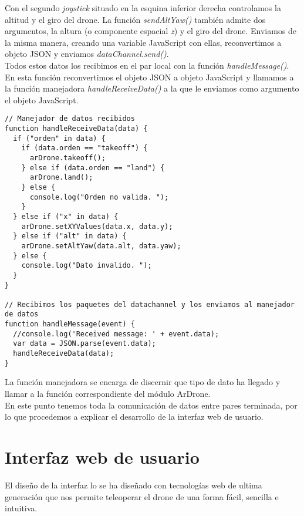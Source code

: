 Con el segundo \emph{joystick} situado en la esquina inferior derecha controlamos la altitud y el giro del drone. La función \emph{sendAltYaw()} también admite dos argumentos, la altura (o componente espacial \emph{z}) y el giro del drone. Enviamos de la misma manera, creando una variable JavaScript con ellas, reconvertimos a objeto JSON y enviamos \emph{dataChannel.send()}.\\

Todos estos datos los recibimos en el par local con la función \emph{handleMessage()}. En esta función reconvertimos el objeto JSON a objeto JavaScript y llamamos a la función manejadora \emph{handleReceiveData()} a la que le enviamos como argumento el objeto JavaScript.\\

\begin{lstlisting}[caption=Manejo de las órdenes recibidas en el par local.]
// Manejador de datos recibidos 
function handleReceiveData(data) {
  if ("orden" in data) {
    if (data.orden == "takeoff") {
      arDrone.takeoff();
    } else if (data.orden == "land") {
      arDrone.land();
    } else {
      console.log("Orden no valida. ");
    }
  } else if ("x" in data) {
    arDrone.setXYValues(data.x, data.y);
  } else if ("alt" in data) {
    arDrone.setAltYaw(data.alt, data.yaw);
  } else {
    console.log("Dato invalido. ");
  }		
}

// Recibimos los paquetes del datachannel y los enviamos al manejador de datos
function handleMessage(event) {
  //console.log('Received message: ' + event.data);
  var data = JSON.parse(event.data);
  handleReceiveData(data);
}
\end{lstlisting}


La función manejadora se encarga de discernir que tipo de dato ha llegado y llamar a la función correspondiente del módulo ArDrone.\\

En este punto tenemos toda la comunicación de datos entre pares terminada, por lo que procedemos a explicar el desarrollo de la interfaz web de usuario.\\

\section{Interfaz web de usuario}

El diseño de la interfaz lo se ha diseñado con tecnologías web de ultima generación que nos permite teleoperar el drone de una forma fácil, sencilla e intuitiva.\\

